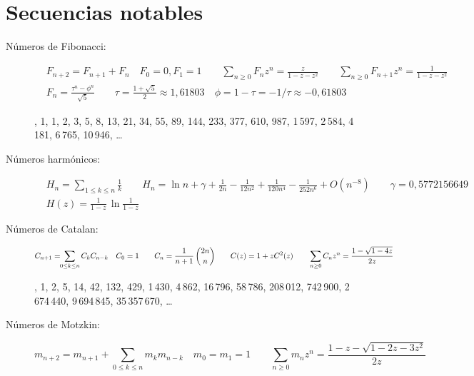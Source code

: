 \documentclass[fleqn, spanish]{article}
\begin{document}
\section*{Secuencias notables}
\label{sec:funciones-notables}

\begin{description}
  \item[Números de Fibonacci:]
    \begin{align*}
      &F_{n + 2} = F_{n + 1} + F_n \quad F_0 = 0, F_1 = 1
	\qquad \sum_{n \ge 0} F_n z^n = \frac{z}{1 - z - z^2}
	\qquad \sum_{n \ge 0} F_{n + 1} z^n = \frac{1}{1 - z - z^2} \\
      &F_n = \frac{\tau^n - \phi^n}{\sqrt{5}}
	\qquad
	\tau = \frac{1 + \sqrt{5}}{2} \approx 1,61803
	\quad \phi = 1 - \tau = -1 / \tau \approx -0,61803
    \end{align*}

    , 1, 1, 2, 3, 5, 8, 13, 21, 34, 55, 89, 144, 233, 377, 610, 987,
    1\,597, 2\,584, 4\,181, 6\,765, 10\,946, \ldots
  \item[Números harmónicos:]
    \begin{align*}
      &H_n
	 = \sum_{1 \le k \le n} \frac{1}{k} \qquad
       H_n = \ln n + \gamma
	       + \frac{1}{2 n}
	       - \frac{1}{12 n^2}
	       + \frac{1}{120 n^4}
	       - \frac{1}{252 n^6}
	       + O(n^{-8})
       \qquad
       \gamma = 0,5772156649 \\
      &H(z)
	 = \frac{1}{1 - z} \, \ln \frac{1}{1 - z}
    \end{align*}
  \item[Números de Catalan:]
    \begin{equation*}
      C_{n + 1} = \!\! \sum_{0 \le k \le n} C_k C_{n - k} \quad C_0 = 1
	\qquad C_n = \frac{1}{n + 1} \, \binom{2 n}{n}
	\qquad C(z) = 1 + z C^2(z)
	\qquad \sum_{n \ge 0} C_n z^n = \frac{1 - \sqrt{1 - 4 z}}{2 z} \\
    \end{equation*}

    , 1, 2, 5, 14, 42, 132, 429, 1\,430, 4\,862, 16\,796, 58\,786, 208\,012,
    742\,900, 2\,674\,440, 9\,694\,845, 35\,357\,670, \ldots
  \item[Números de Motzkin:]
    \begin{equation*}
      m_{n + 2} = m_{n + 1} + \sum_{0 \le k \le n} m_k m_{n - k}
	\quad m_0 = m_1 = 1
	\qquad \sum_{n \ge 0} m_n z^n
		 = \frac{1 - z - \sqrt{1 - 2 z - 3 z^2}}{2 z}
    \end{equation*}


\end{description}
\end{document}
